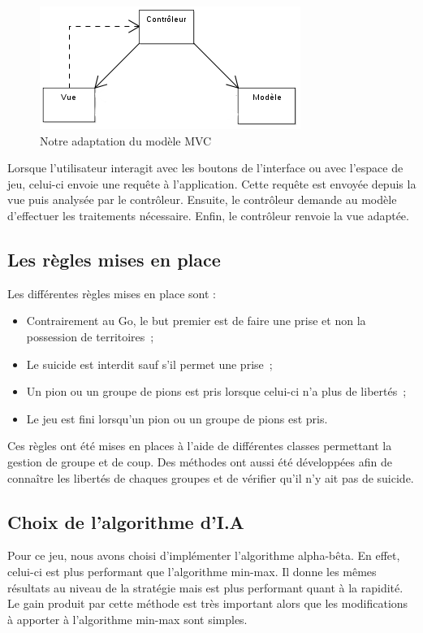 \documentclass[11pt,a4paper]{article}
\begin{document}
	\begin{figure}[!ht]
    	\begin{center}
			\includegraphics{ModeleMVC.png}
		\end{center}
	\caption{Notre adaptation du modèle MVC}
	\label{modeleMVC}
	\end{figure}

	Lorsque l'utilisateur interagit avec les boutons de l'interface ou avec
	l'espace de jeu, celui-ci envoie une requête à l'application.
	Cette requête est envoyée depuis la vue puis analysée par le contrôleur.
	Ensuite, le contrôleur demande au modèle d'effectuer les traitements
	nécessaire. Enfin, le contrôleur renvoie la vue adaptée.
	

	\subsection{Les règles mises en place}
		\label{regles}

	Les différentes règles mises en place sont :
	
	\begin{itemize}
		\item Contrairement au Go, le but premier est de faire une prise et non la
		possession de territoires~;
		\item Le suicide est interdit sauf s'il permet une prise~;
		\item Un pion ou un groupe de pions est pris lorsque celui-ci n'a plus de
		libertés~;
		\item Le jeu est fini lorsqu'un pion ou un groupe de pions est pris.\\
    \end{itemize}
    
    Ces règles ont été mises en places à l'aide de différentes classes
    permettant la gestion de groupe et de coup. Des méthodes ont aussi été
    développées afin de connaître les libertés de chaques groupes et de
    vérifier qu'il n'y ait pas de suicide.

	\subsection{Choix de l'algorithme d'I.A}
		\label{choix_alpha_beta}
	Pour ce jeu, nous avons choisi d'implémenter l'algorithme alpha-bêta. En
	effet, celui-ci est plus performant que l'algorithme min-max. Il donne les
	mêmes résultats au niveau de la stratégie mais est plus performant quant à la
	rapidité. Le gain produit par cette méthode est très important alors que les
	modifications à apporter à l'algorithme min-max sont simples.
	
\end{document}
